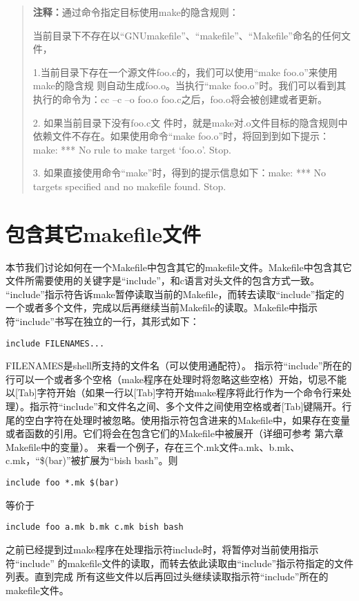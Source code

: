 \begin{quote}\kaishu

\textbf{注释：}通过命令指定目标使用make的隐含规则：

当前目录下不存在以“GNUmakefile”、“makefile”、“Makefile”命名的任何文件，

1.当前目录下存在一个源文件foo.c的，我们可以使用“make foo.o”来使用make的隐含规
则自动生成foo.o。当执行“make foo.o”时。我们可以看到其执行的命令为：cc –c –o
foo.o foo.c之后，foo.o将会被创建或者更新。

2.        如果当前目录下没有foo.c文
件时，就是make对.o文件目标的隐含规则中依赖文件不存在。如果使用命令“make
foo.o”时，将回到到如下提示：make: *** No rule to make target ‘foo.o’. Stop.

3.        如果直接使用命令“make”时，得到的提示信息如下：make: *** No targets
specified and no makefile found. Stop.
\end{quote}

\section{包含其它makefile文件}
本节我们讨论如何在一个Makefile中包含其它的makefile文件。Makefile中包含其它文件所需要使用的关键字是“include”，和c语言对头文件的包含方式一致。
“include”指示符告诉make暂停读取当前的Makefile，而转去读取“include”指定的一个或者多个文件，完成以后再继续当前Makefile的读取。Makefile中指示符“include”书写在独立的一行，其形式如下：

\begin{Verbatim}[]
include FILENAMES...
\end{Verbatim}

FILENAMES是shell所支持的文件名（可以使用通配符）。
指示符“include”所在的行可以一个或者多个空格（make程序在处理时将忽略这些空格）开始，切忌不能以[Tab]字符开始（如果一行以[Tab]字符开始make程序将此行作为一个命令行来处理）。指示符“include”和文件名之间、多个文件之间使用空格或者[Tab]键隔开。行尾的空白字符在处理时被忽略。使用指示符包含进来的Makefile中，如果存在变量或者函数的引用。它们将会在包含它们的Makefile中被展开（详细可参考 第六章 Makefile中的变量）。
来看一个例子，存在三个.mk文件a.mk、b.mk、c.mk，“\$(bar)”被扩展为“bish bash”。则
\begin{Verbatim}[]
include foo *.mk $(bar)
\end{Verbatim}
等价于
\begin{Verbatim}[]
include foo a.mk b.mk c.mk bish bash
\end{Verbatim}

之前已经提到过make程序在处理指示符include时，将暂停对当前使用指示符“include”
的makefile文件的读取，而转去依此读取由“include”指示符指定的文件列表。直到完成
所有这些文件以后再回过头继续读取指示符“include”所在的makefile文件。

